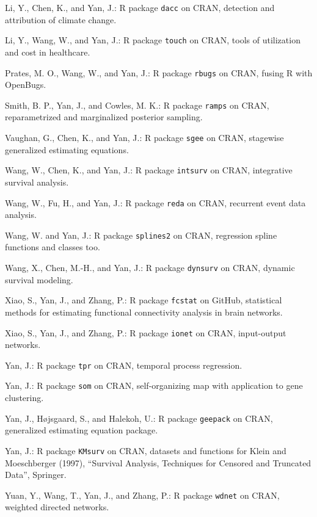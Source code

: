 \documentclass[Statistics]{vita}
\begin{document}
\begin{vita}
\begin{Publications}
\begin{Software}
  \item *Li, Y., Chen, K., and Yan, J.: R package \texttt{dacc} on CRAN, detection and attribution of climate change.
  \item *Li, Y., Wang, W., and Yan, J.: R package \texttt{touch} on CRAN, tools of utilization and cost in healthcare.
  \item *Prates, M. O., Wang, W., and Yan, J.: R package \texttt{rbugs} on CRAN, fusing R with OpenBugs.
  \item Smith, B. P., Yan, J., and Cowles, M. K.: R package \texttt{ramps} on CRAN, reparametrized and marginalized posterior sampling.
  \item *Vaughan, G., Chen, K., and Yan, J.: R package \texttt{sgee} on CRAN, stagewise generalized estimating equations.
  \item *Wang, W., Chen, K., and Yan, J.: R package \texttt{intsurv} on CRAN, integrative survival analysis.
  \item *Wang, W., Fu, H., and Yan, J.: R package \texttt{reda} on CRAN, recurrent event data analysis.
  \item *Wang, W. and Yan, J.: R package \texttt{splines2} on CRAN, regression spline functions and classes too.
  \item *Wang, X., Chen, M.-H., and Yan, J.: R package \texttt{dynsurv} on CRAN, dynamic survival modeling.
  \item *Xiao, S., Yan, J., and Zhang, P.: R package \texttt{fcstat} on GitHub, statistical methods for estimating functional connectivity analysis in brain networks.
  \item *Xiao, S., Yan, J., and Zhang, P.: R package \texttt{ionet} on CRAN, input-output networks.
  \item Yan, J.: R package \texttt{tpr} on CRAN, temporal process regression.
  \item Yan, J.: R package \texttt{som} on CRAN, self-organizing map with application to gene clustering.
  \item Yan, J., H\o{}jsgaard, S., and Halekoh, U.: R package \texttt{geepack} on CRAN, generalized estimating equation package.
  \item Yan, J.: R package \texttt{KMsurv} on CRAN,  datasets and functions for Klein and Moeschberger (1997), ``Survival Analysis, Techniques for Censored and Truncated Data'', Springer.
  \item *Yuan, Y., Wang, T., Yan, J., and Zhang, P.: R package \texttt{wdnet} on CRAN, weighted directed networks.

\end{Software}
\end{Publications}
\end{vita}
\end{document}
